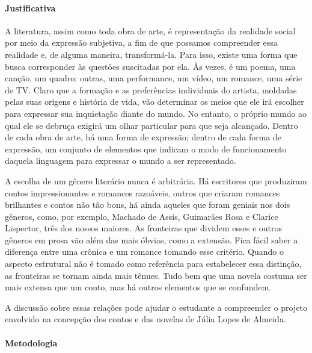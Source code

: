 \documentclass[12pt]{extarticle}
\begin{document}
\paragraph{Justificativa} A literatura, assim como toda obra de arte, é
representação da realidade social por meio da expressão subjetiva, a fim
de que possamos compreender essa realidade e, de alguma maneira,
transformá-la. Para isso, existe uma forma que busca corresponder às
questões suscitadas por ela. Às vezes, é um poema, uma canção, um
quadro; outras, uma performance, um vídeo, um romance, uma série de TV.
Claro que a formação e as preferências individuais do artista, moldadas
pelas suas origens e história de vida, vão determinar os meios que ele
irá escolher para expressar sua inquietação diante do mundo. No entanto,
o próprio mundo ao qual ele se debruça exigirá um olhar particular para
que seja alcançado. Dentro de cada obra de arte, há uma forma de
expressão; dentro de cada forma de expressão, um conjunto de elementos
que indicam o modo de funcionamento daquela linguagem para expressar o
mundo a ser representado.

A escolha de um gênero literário nunca é arbitrária. Há escritores que
produziram contos impressionantes e romances razoáveis, outros que
criaram romances brilhantes e contos não tão bons, há ainda aqueles que
foram geniais nos dois gêneros, como, por exemplo, Machado de Assis,
Guimarães Rosa e Clarice Lispector, três dos nossos maiores. As
fronteiras que dividem esses e outros gêneros em prosa vão além das mais
óbvias, como a extensão. Fica fácil saber a diferença entre uma crônica
e um romance tomando esse critério. Quando o aspecto estrutural não é
tomado como referência para estabelecer essa distinção, as fronteiras se
tornam ainda mais tênues. Tudo bem que uma novela costuma ser mais
extensa que um conto, mas há outros elementos que se confundem.

A discussão sobre essas relações pode ajudar o estudante a compreender o
projeto envolvido na concepção dos contos e das novelas de Júlia Lopes
de Almeida.

\paragraph{Metodologia} 
\end{document}
